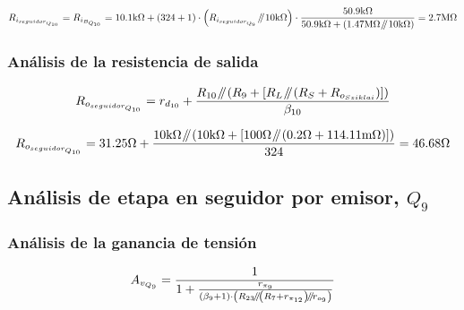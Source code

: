 \begin{equation*}
R_{i_{seguidor_{Q_{10}}}} = R_{i_{B_{Q_{10}}}} = 10.1 \si[per-mode=symbol]{\kilo\ohm} + \left( 324 + 1 \right) \cdot  \left(  R_{i_{seguidor_{Q_{9}}}} \parallelresistors 10 \si[per-mode=symbol]{\kilo\ohm}   \right)  \cdot \frac{  50.9 \si[per-mode=symbol]{\kilo\ohm} }{  50.9 \si[per-mode=symbol]{\kilo\ohm} + \left(  1.47 \si[per-mode=symbol]{\mega\ohm} \parallelresistors 10 \si[per-mode=symbol]{\kilo\ohm}   \right)  } = 2.7 \si[per-mode=symbol]{\mega\ohm}
\end{equation*}


\subsubsection{Análisis de la resistencia de salida}

\begin{equation}
R_{o_{seguidor_{Q_{10}}}} = r_{d_{10}} + \frac{   R_{10} \parallelresistors \left( R_{9} + \left[  R_{L} \parallelresistors \left( R_{S} + R_{o_{Sziklai}} \right) \right]  \right) }{\beta_{10}}  
\end{equation}


\begin{equation*}
R_{o_{seguidor_{Q_{10}}}} = 31.25 \si[per-mode=symbol]{\ohm} + \frac{   10 \si[per-mode=symbol]{\kilo\ohm} \parallelresistors \left( 10 \si[per-mode=symbol]{\kilo\ohm} + \left[  100 \si[per-mode=symbol]{\ohm} \parallelresistors \left( 0.2 \si[per-mode=symbol]{\ohm} + 114.11 \si[per-mode=symbol]{\milli\ohm} \right) \right]  \right) }{324} = 46.68 \si[per-mode=symbol]{\ohm}
\end{equation*}


\subsection{Análisis de etapa en seguidor por emisor, $Q_{9}$}



\subsubsection{Análisis de la ganancia de tensión}

\begin{equation}
A_{v_{Q_{9}}} = \frac{1}{1 + \frac{r_{\pi_{9}}}{  \left(  \beta_{9} + 1 \right) \cdot \left(  R_{23} \parallelresistors \left(  R_{7} + r_{\pi_{12}} \right) \parallelresistors r_{o_{9}}  \right)  } }
\end{equation}


